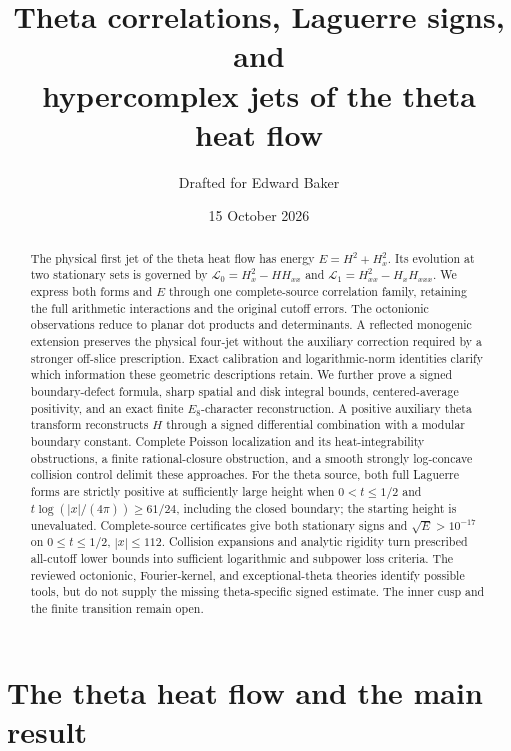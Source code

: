 \documentclass[11pt]{article}
\title{Theta correlations, Laguerre signs, and\\hypercomplex jets of the theta heat flow}
\author{Drafted for Edward Baker}
\date{15 October 2026}
\numberwithin{equation}{section}
\theoremstyle{definition}
\theoremstyle{remark}
\newcommand{\Lag}{\mathcal L}
\begin{document}
\maketitle
\begin{abstract}
The physical first jet of the theta heat flow has energy
$E=H^2+H_x^2$. Its evolution at two stationary sets is governed by
$\Lag_0=H_x^2-HH_{xx}$ and $\Lag_1=H_{xx}^2-H_xH_{xxx}$.
We express both forms and $E$ through one complete-source correlation
family, retaining the full arithmetic interactions and the original
cutoff errors. The octonionic observations reduce to planar dot products
and determinants. A reflected monogenic extension preserves the physical
four-jet without the auxiliary correction required by a stronger
off-slice prescription. Exact calibration and logarithmic-norm identities
clarify which information these geometric descriptions retain.
We further prove a signed boundary-defect formula, sharp spatial and disk
integral bounds, centered-average positivity, and an exact finite
$E_8$-character reconstruction. A positive auxiliary theta transform
reconstructs $H$ through a signed differential combination with a modular
boundary constant. Complete Poisson localization and its heat-integrability
obstructions, a finite rational-closure obstruction, and a smooth
strongly log-concave collision control delimit these approaches.
For the theta source, both full Laguerre forms are strictly positive at
sufficiently large height when $0<t\le1/2$ and
$t\log(|x|/(4\pi))\ge61/24$, including the closed boundary; the
starting height is unevaluated. Complete-source certificates give both
stationary signs and $\sqrt E>10^{-17}$ on $0\le t\le1/2$, $|x|\le112$.
Collision expansions and analytic rigidity turn prescribed all-cutoff
lower bounds into sufficient logarithmic and subpower loss criteria.
The reviewed octonionic, Fourier-kernel, and exceptional-theta theories
identify possible tools, but do not supply the missing theta-specific
signed estimate. The inner cusp and the finite transition remain open.
\end{abstract}
\makeatletter
\renewcommand*\l@subsection{\@dottedtocline{2}{1.5em}{3em}}
\makeatother
\tableofcontents

\section{The theta heat flow and the main result}\label{sec:introduction}
\end{document}
